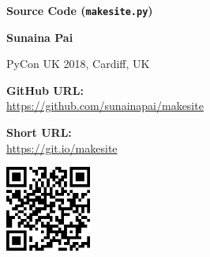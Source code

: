 \documentclass[a2,portrait]{a0poster}
\begin{document}
\begin{minipage}[b]{0.40\linewidth}
    \normalsize
    \color{Navy}
    \textbf{Source Code (\texttt{makesite.py})}

    \smallskip

    \small
    \color{black}
    \textbf{Sunaina Pai}

    \smallskip

    PyCon UK 2018, Cardiff, UK
\end{minipage}
%
\hfill
%
\begin{minipage}[b]{0.40\linewidth}
    \footnotesize
    \color{DarkSlateGray}
    \textbf{GitHub URL:} \\
    \url{https://github.com/sunainapai/makesite}

    \vspace{1mm}

    \textbf{Short URL:} \\
    \url{https://git.io/makesite}
\end{minipage}
%
\newcommand{\qrsize}{28mm}
\begin{minipage}[b]{\qrsize}
    \href{https://github.com/sunainapai/makesite}{%
        \includegraphics[width=\qrsize]{makesite-qr.png}%
    }
\end{minipage}

\bigskip

\tiny
\end{document}
